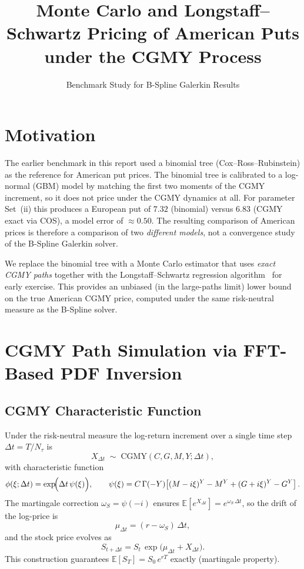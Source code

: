 \documentclass[11pt,a4paper]{article}
\title{Monte Carlo and Longstaff--Schwartz Pricing of American Puts
       under the CGMY Process}
\author{Benchmark Study for B-Spline Galerkin Results}
\date{}
\newcommand{\E}{\mathbb{E}}
\begin{document}
\maketitle

\section{Motivation}

The earlier benchmark in this report used a binomial tree (Cox--Ross--Rubinstein)
as the reference for American put prices.  The binomial tree is calibrated to a
log-normal (GBM) model by matching the first two moments of the CGMY increment,
so it does not price under the CGMY dynamics at all.  For parameter Set~(ii)
this produces a European put of $7.32$ (binomial) versus $6.83$ (CGMY exact via
COS), a model error of $\approx 0.50$.  The resulting comparison of American
prices is therefore a comparison of two \emph{different models}, not a
convergence study of the B-Spline Galerkin solver.

We replace the binomial tree with a Monte Carlo estimator that uses
\emph{exact CGMY paths} together with the Longstaff--Schwartz regression
algorithm~\cite{LS2001} for early exercise.  This provides an unbiased (in the
large-paths limit) lower bound on the true American CGMY price, computed under
the same risk-neutral measure as the B-Spline solver.

\section{CGMY Path Simulation via FFT-Based PDF Inversion}

\subsection{CGMY Characteristic Function}

Under the risk-neutral measure the log-return increment over a single time step
$\Delta t = T/N_\tau$ is
\[
  X_{\Delta t} \;\sim\; \mathrm{CGMY}(C,G,M,Y;\Delta t),
\]
with characteristic function
\[
  \phi(\xi;\Delta t)
  = \exp\!\Bigl(\Delta t\,\psi(\xi)\Bigr),
  \qquad
  \psi(\xi)
  = C\,\Gamma(-Y)\!\left[(M-i\xi)^Y - M^Y + (G+i\xi)^Y - G^Y\right].
\]
The martingale correction $\omega_S = \psi(-i)$ ensures
$\E[e^{X_{\Delta t}}] = e^{\omega_S\,\Delta t}$, so the drift of the log-price is
\[
  \mu_{\Delta t} = (r - \omega_S)\,\Delta t,
\]
and the stock price evolves as
\[
  S_{t+\Delta t} = S_t\,\exp\!\bigl(\mu_{\Delta t} + X_{\Delta t}\bigr).
\]
This construction guarantees $\E[S_T] = S_0\,e^{rT}$ exactly (martingale
property).
\end{document}
